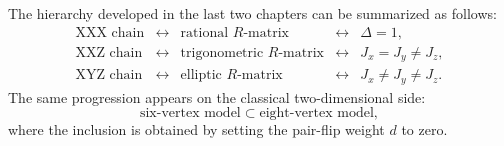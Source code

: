 The hierarchy developed in the last two chapters can be summarized as follows:
\begin{equation}
\label{eq:R-matrix-hierarchy-summary}
\begin{array}{ccccc}
\text{XXX chain}
&\longleftrightarrow&
\text{rational }R\text{-matrix}
&\longleftrightarrow&
\Delta=1,\\[3pt]
\text{XXZ chain}
&\longleftrightarrow&
\text{trigonometric }R\text{-matrix}
&\longleftrightarrow&
J_x=J_y\neq J_z,\\[3pt]
\text{XYZ chain}
&\longleftrightarrow&
\text{elliptic }R\text{-matrix}
&\longleftrightarrow&
J_x\neq J_y\neq J_z.
\end{array}
\end{equation}
The same progression appears on the classical two-dimensional side:
\begin{equation}
\label{eq:vertex-model-hierarchy-summary}
    \text{six-vertex model}
    \subset
    \text{eight-vertex model},
\end{equation}
where the inclusion is obtained by setting the pair-flip weight $d$ to zero.

